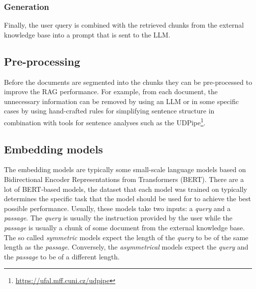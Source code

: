 \subsubsection{Generation}

Finally, the user query is combined with the retrieved chunks from the external knowledge base into a prompt that is sent to the LLM.


\subsection{Pre-processing}

Before the documents are segmented into the chunks they can be pre-processed to improve the RAG performance. For example, from each document, the unnecessary information can be removed by using an LLM or in some specific cases by using hand-crafted rules for simplifying sentence structure in combination with tools for sentence analyses such as the UDPipe\footnote{\url{https://ufal.mff.cuni.cz/udpipe}}.


\subsection{Embedding models}

The embedding models are typically some small-scale language models based on Bidirectional Encoder Representations from Transformers (BERT). There are a lot of BERT-based models, the dataset that each model was trained on typically determines the specific task that the model should be used for to achieve the best possible performance. Usually, these models take two inputs: a \textit{query} and a \textit{passage}. The \textit{query} is usually the instruction provided by the user while the \textit{passage} is usually a chunk of some document from the external knowledge base. The so called \textit{symmetric} models expect the length of the \textit{query} to be of the same length as the \textit{passage}. Conversely, the \textit{asymmetrical} models expect the \textit{query} and the \textit{passage} to be of a different length.